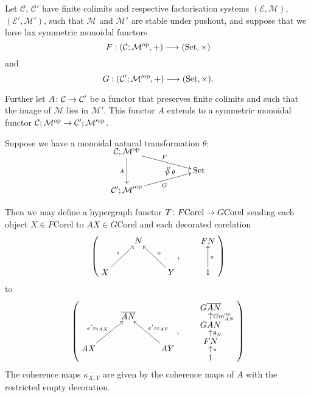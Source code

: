 \begin{proposition}\label{prop.deccorelfunctors}
  Let $\mathcal C$, $\mathcal C'$ have finite colimits and respective
factorisation systems $(\mathcal E, \mathcal M)$, $(\mathcal E', \mathcal M')$,
such that $\mathcal M$ and $\mathcal M'$ are stable under pushout, and suppose
that we have lax symmetric monoidal functors
\[
  F: (\mathcal C;\mathcal M^{\mathrm{op}},+) \longrightarrow (\mathrm{Set}, \times)
\]
and
\[
  G: (\mathcal C';\mathcal M'^{\mathrm{op}},+) \longrightarrow (\mathrm{Set}, \times).
\]

Further let $A{\colon} \mathcal C \to \mathcal C'$ be a functor that preserves
finite colimits and such that the image of $\mathcal M$ lies in $\mathcal M'$.
This functor $A$ extends to a symmetric monoidal functor $\mathcal C;\mathcal M^{\mathrm{op}} \to
\mathcal C';\mathcal M'^{\mathrm{op}}$.

Suppose we have a monoidal natural transformation $\theta$:
\[
  \xymatrixrowsep{2ex}
  \xymatrix{
    \mc C; \mc M^\opp \ar[dd]_{A} \ar[drr]^F  \\
    &\twocell \omit{_\:\theta}& \Set \\
    \mc C'; \mc {M'}^\opp \ar[urr]_{G} 
  }
\]

Then we may define a hypergraph functor $T{\colon} F\mathrm{Corel} \to
G\mathrm{Corel}$ sending each object $X \in F\mathrm{Corel}$ to $AX \in
G\mathrm{Corel}$ and each decorated corelation 
  \[
    \left(
    \begin{aligned}
      \xymatrix{
	& N \\  
	X \ar[ur]^{i} && Y \ar[ul]_{o}
      }
    \end{aligned}
    ,
    \qquad
    \begin{aligned}
      \xymatrix{
	FN \\
	1 \ar[u]_{s}
      }
    \end{aligned}
    \right)
  \]  
to
  \[
    \left(
    \begin{aligned}
      \xymatrix{
	& \overline{AN} \\  
	AX \ar[ur]^{e'\circ\iota_{AX}} && AY \ar[ul]_{e'\circ\iota_{AY}}
      }
    \end{aligned}
    ,
    \qquad
    \begin{aligned}
      \xymatrixrowsep{1.5ex}
      \xymatrix{
	G\overline{AN} \\
	GAN \ar[u]_{Gm_{AN}^\opp}\\
        FN \ar[u]_{\theta_N}\\
	1 \ar[u]_{s}
      }
    \end{aligned}
    \right)
  \]  
  The coherence maps $\overline{\kappa_{X,Y}}$ are given by the coherence maps of
  $A$ with the restricted empty decoration.
\end{proposition}
